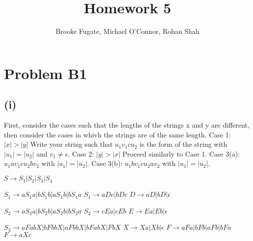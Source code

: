 \documentclass[12pt]{article}
\begin{document}
\pagestyle{plain}
\titleformat{\subsection}[runin]
  {\normalfont\large\bfseries}{\thesubsection}{1em}{}

\title{Homework 5}
\author{Brooke Fugate, Michael O'Connor, Rohan Shah}
\date{}

\maketitle

\section*{Problem B1}
\subsection*{(i)}

First, consider the cases such that the lengths of the strings x and y are different, then consider the cases in whivh the strings are of the same length. \newline
Case 1: $|x| > |y|$ Write your string such that $u_1v_1cu_2$ is the form of the string with $|u_1|=|u_2|$ and $v_1 \neq \epsilon$. \newline
Case 2: $|y| > |x|$ Proceed similarly to Case 1. \newline
Case 3(a): $u_1av_1cu_2bv_2$ with $|u_1|=|u_2|$. \newline 
Case 3(b): $u_1bv_1cu_2av_2$ with $|u_1|=|u_2|$.

\medskip 

$S \rightarrow S_1|S_2|S_3|S_4$ \newline

$S_1 \rightarrow aS_1a|bS_1b|aS_1b|bS_1a$ \newline
$S_1 \rightarrow aDc|bDc$ \newline
$D \rightarrow aD|bD| \epsilon$ \newline

$S_2 \rightarrow aS_2a|bS_2b|aS_2b|bS_2a$ \newline
$S_2 \rightarrow cEa|cEb$ \newline
$E \rightarrow Ea|Eb| \epsilon$ \newline

$S_3 \rightarrow aFabX|bFbbX|aFbbX|bFabX|FbX$ \newline
$X \rightarrow Xa|Xb|\epsilon$ \newline
$F \rightarrow aFa|bFb|aFb|bFa$ \newline
$F \rightarrow aXc$ \newline
\end{document}

